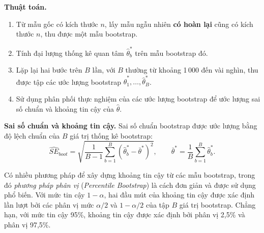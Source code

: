 \documentclass[14pt,a4paper]{extarticle}\usepackage[]{graphicx}\usepackage[]{xcolor}
\begin{document}
\textbf{Thuật toán.}
\begin{enumerate}
  \item Từ mẫu gốc có kích thước $n$, lấy mẫu ngẫu nhiên \textbf{có hoàn lại}
        cũng có kích thước $n$, thu được một mẫu bootstrap.
  \item Tính đại lượng thống kê quan tâm $\hat{\theta}^{*}_{b}$ trên mẫu
        bootstrap đó.
  \item Lặp lại hai bước trên $B$ lần, với $B$ thường từ khoảng 1\,000 đến
        vài nghìn, thu được tập các ước lượng bootstrap
        $\hat{\theta}^{*}_{1}, \ldots, \hat{\theta}^{*}_{B}$.
  \item Sử dụng phân phối thực nghiệm của các ước lượng bootstrap để ước
        lượng sai số chuẩn và khoảng tin cậy của $\hat{\theta}$.
\end{enumerate}

\textbf{Sai số chuẩn và khoảng tin cậy.} Sai số chuẩn bootstrap được ước
lượng bằng độ lệch chuẩn của $B$ giá trị thống kê bootstrap:
\[
  \widehat{SE}_{boot} =
  \sqrt{\frac{1}{B-1}\sum_{b=1}^{B}
  \left(\hat{\theta}^{*}_{b}-\bar{\theta}^{*}\right)^2},
  \qquad
  \bar{\theta}^{*}=
  \frac{1}{B}\sum_{b=1}^{B}\hat{\theta}^{*}_{b}.
\]

Có nhiều phương pháp để xây dựng khoảng tin cậy từ các mẫu bootstrap, trong
đó \emph{phương pháp phân vị} (\emph{Percentile Bootstrap}) là cách đơn giản
và được sử dụng phổ biến. Với mức tin cậy $1-\alpha$, hai đầu mút của khoảng
tin cậy được xác định lần lượt bởi các phân vị mức $\alpha/2$ và
$1-\alpha/2$ của tập $B$ giá trị bootstrap. Chẳng hạn, với mức tin cậy
95\%, khoảng tin cậy được xác định bởi phân vị 2,5\% và phân vị 97,5\%.
\end{document}
